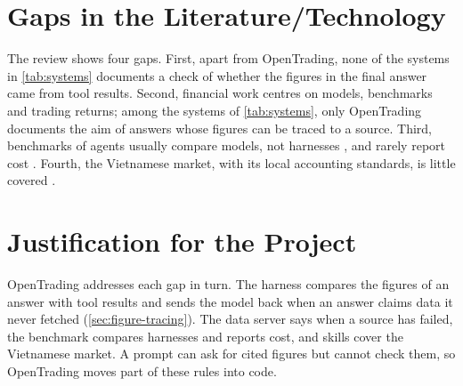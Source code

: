 \section{Gaps in the Literature/Technology}\label{sec:gaps}
The review shows four gaps.
First, apart from OpenTrading, none of the systems in \cref{tab:systems} documents a check of whether the figures in the final answer came from tool results.
Second, financial work centres on models, benchmarks and trading returns; among the systems of \cref{tab:systems}, only OpenTrading documents the aim of answers whose figures can be traced to a source.
Third, benchmarks of agents usually compare models, not harnesses \parencite{liu2024agentbench}, and rarely report cost \parencite{kapoor2024agents}.
Fourth, the Vietnamese market, with its local accounting standards, is little covered \parencite{nguyen2025finstat2sql}.

\section{Justification for the Project}\label{sec:justification}
OpenTrading addresses each gap in turn.
The harness compares the figures of an answer with tool results and sends the model back when an answer claims data it never fetched (\cref{sec:figure-tracing}).
The data server says when a source has failed, the benchmark compares harnesses and reports cost, and skills cover the Vietnamese market.
A prompt can ask for cited figures but cannot check them, so OpenTrading moves part of these rules into code.
